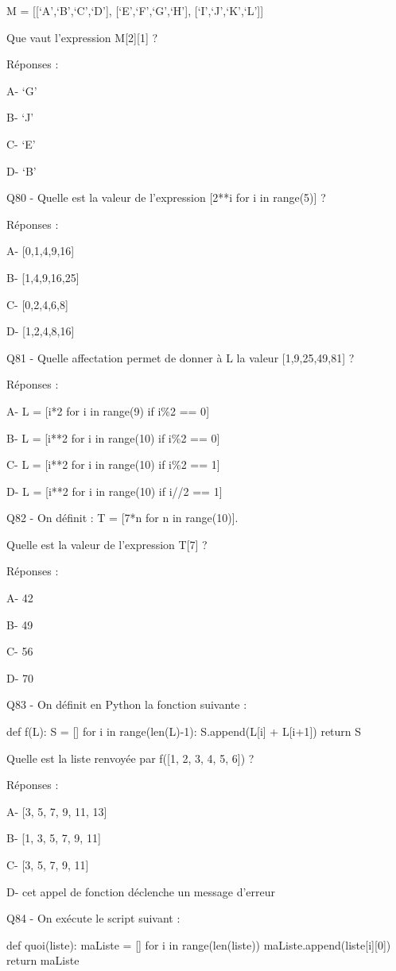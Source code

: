 \documentclass[
]{book}
\begin{document}
M = {[}{[}`A',`B',`C',`D'{]}, {[}`E',`F',`G',`H'{]}, {[}`I',`J',`K',`L'{]}{]}

Que vaut l'expression M{[}2{]}{[}1{]} ?

Réponses :

A- `G'

B- `J'

C- `E'

D- `B'

Q80 - Quelle est la valeur de l'expression {[}2**i for i in range(5){]} ?

Réponses :

A- {[}0,1,4,9,16{]}

B- {[}1,4,9,16,25{]}

C- {[}0,2,4,6,8{]}

D- {[}1,2,4,8,16{]}

Q81 - Quelle affectation permet de donner à L la valeur {[}1,9,25,49,81{]} ?

Réponses :

A- L = {[}i*2 for i in range(9) if i\%2 == 0{]}

B- L = {[}i**2 for i in range(10) if i\%2 == 0{]}

C- L = {[}i**2 for i in range(10) if i\%2 == 1{]}

D- L = {[}i**2 for i in range(10) if i//2 == 1{]}

Q82 - On définit : T = {[}7*n for n in range(10){]}.

Quelle est la valeur de l'expression T{[}7{]} ?

Réponses :

A- 42

B- 49

C- 56

D- 70

Q83 - On définit en Python la fonction suivante :

def f(L):
S = {[}{]}
for i in range(len(L)-1):
S.append(L{[}i{]} + L{[}i+1{]})
return S

Quelle est la liste renvoyée par f({[}1, 2, 3, 4, 5, 6{]}) ?

Réponses :

A- {[}3, 5, 7, 9, 11, 13{]}

B- {[}1, 3, 5, 7, 9, 11{]}

C- {[}3, 5, 7, 9, 11{]}

D- cet appel de fonction déclenche un message d'erreur

Q84 - On exécute le script suivant :

def quoi(liste):
maListe = {[}{]}
for i in range(len(liste))
maListe.append(liste{[}i{]}{[}0{]})
return maListe
\end{document}
